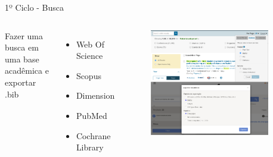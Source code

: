 \begin{frame}{1º Ciclo - Busca}
	\begin{columns}
        Fazer uma busca em uma base acadêmica e exportar .bib
        \begin{itemize}
            \item Web Of Science
            \item Scopus
            \item Dimension
            \item PubMed
            \item Cochrane Library
        \end{itemize}
		\begin{figure}[hb]
            \includegraphics[width=0.9\textwidth]{figures/bases.png}
		\end{figure}
	\end{columns}
\end{frame}

